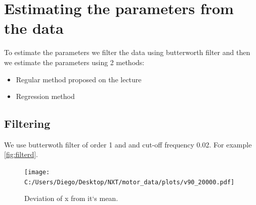 \documentclass[a4paper,12pt,oneside]{article}
\begin{document}
\section {Estimating the parameters from the data}
To estimate the parameters we filter the data using butterworth filter and then we estimate the parameters using 2 methods:
\begin{itemize}
\item Regular method proposed on the lecture
\item Regression method
\end{itemize}

\subsection {Filtering}
We use butterwoth filter of order 1 and and cut-off frequency 0.02. For example \cref{fig:filterd}.
\begin{figure}[t]%
	\centering
	\texttt{[image: C:/Users/Diego/Desktop/NXT/motor\_data/plots/v90\_20000.pdf]}
	\caption{Deviation of x from it`s mean.}%
	\label{fig:filtered}%
\end{figure}
\end{document}

